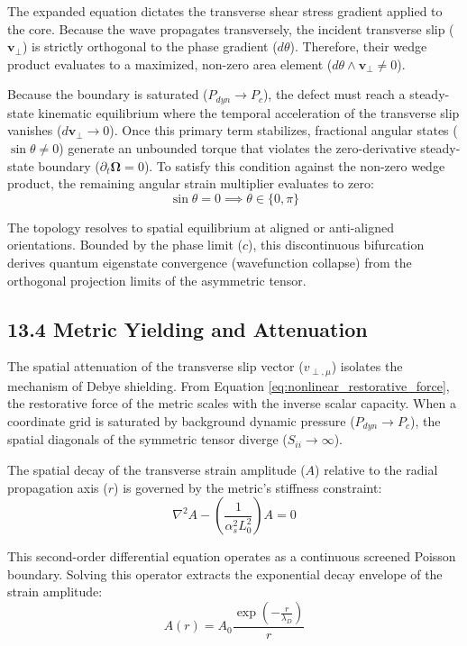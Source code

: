 The expanded equation dictates the transverse shear stress gradient applied to the core. Because the wave propagates transversely, the incident transverse slip ($\mathbf{v}_\perp$) is strictly orthogonal to the phase gradient ($d\theta$). Therefore, their wedge product evaluates to a maximized, non-zero area element ($d\theta \wedge \mathbf{v}_\perp \neq 0$). 

Because the boundary is saturated ($P_{dyn} \to P_c$), the defect must reach a steady-state kinematic equilibrium where the temporal acceleration of the transverse slip vanishes ($d\mathbf{v}_\perp \to 0$). Once this primary term stabilizes, fractional angular states ($\sin\theta \neq 0$) generate an unbounded torque that violates the zero-derivative steady-state boundary ($\partial_t \boldsymbol{\Omega} = 0$). To satisfy this condition against the non-zero wedge product, the remaining angular strain multiplier evaluates to zero: 
\begin{equation}
    \sin\theta = 0 \implies \theta \in \{0, \pi\}
\end{equation}

The topology resolves to spatial equilibrium at aligned or anti-aligned orientations. Bounded by the phase limit ($c$), this discontinuous bifurcation derives quantum eigenstate convergence (wavefunction collapse) from the orthogonal projection limits of the asymmetric tensor.


\subsection*{13.4 Metric Yielding and Attenuation} 
The spatial attenuation of the transverse slip vector ($v_{\perp, \mu}$) isolates the mechanism of Debye shielding. From Equation \ref{eq:nonlinear_restorative_force}, the restorative force of the metric scales with the inverse scalar capacity. When a coordinate grid is saturated by background dynamic pressure ($P_{dyn} \to P_c$), the spatial diagonals of the symmetric tensor diverge ($S_{ii} \to \infty$). 

The spatial decay of the transverse strain amplitude ($A$) relative to the radial propagation axis ($r$) is governed by the metric's stiffness constraint: 
\begin{equation}
    \nabla^2 A - \left( \frac{1}{\alpha_s^2 L_0^2} \right) A = 0
\end{equation}

This second-order differential equation operates as a continuous screened Poisson boundary. Solving this operator extracts the exponential decay envelope of the strain amplitude: 
\begin{equation}
    A(r) = A_0 \frac{\exp\left(-\frac{r}{\lambda_D}\right)}{r} 
\end{equation}

